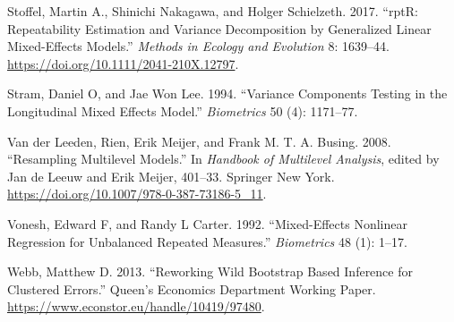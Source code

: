 \begin{CSLReferences}{1}{0}
\leavevmode{}%
Stoffel, Martin A., Shinichi Nakagawa, and Holger Schielzeth. 2017. {``{rptR}: Repeatability Estimation and Variance Decomposition by Generalized Linear Mixed-Effects Models.''} \emph{Methods in Ecology and Evolution} 8: 1639--44. \url{https://doi.org/10.1111/2041-210X.12797}.

\leavevmode{}%
Stram, Daniel O, and Jae Won Lee. 1994. {``Variance Components Testing in the Longitudinal Mixed Effects Model.''} \emph{Biometrics} 50 (4): 1171--77.

\leavevmode{}%
Van der Leeden, Rien, Erik Meijer, and Frank M. T. A. Busing. 2008. {``Resampling Multilevel Models.''} In \emph{Handbook of Multilevel Analysis}, edited by Jan de Leeuw and Erik Meijer, 401--33. Springer New York. \url{https://doi.org/10.1007/978-0-387-73186-5_11}.

\leavevmode{}%
Vonesh, Edward F, and Randy L Carter. 1992. {``Mixed-Effects Nonlinear Regression for Unbalanced Repeated Measures.''} \emph{Biometrics} 48 (1): 1--17.

\leavevmode{}%
Webb, Matthew D. 2013. {``Reworking Wild Bootstrap Based Inference for Clustered Errors.''} Queen's Economics Department Working Paper. \url{https://www.econstor.eu/handle/10419/97480}.

\end{CSLReferences}



\address{%
Adam Loy\\
Carleton College\\%
Northfield, MN, USA\\
%
\url{https://aloy.rbind.io/}\\%
\textit{ORCiD: \href{https://orcid.org/0000-0002-5780-4611}{0000-0002-5780-4611}}\\%
\href{mailto:aloy@carleton.edu}{\nolinkurl{aloy@carleton.edu}}%
}

\address{%
Jenna Korobova\\
Carleton College\\%
Northfield, MN, USA\\
%
%
%
\href{mailto:jenna.korobova@gmail.com}{\nolinkurl{jenna.korobova@gmail.com}}%
}
